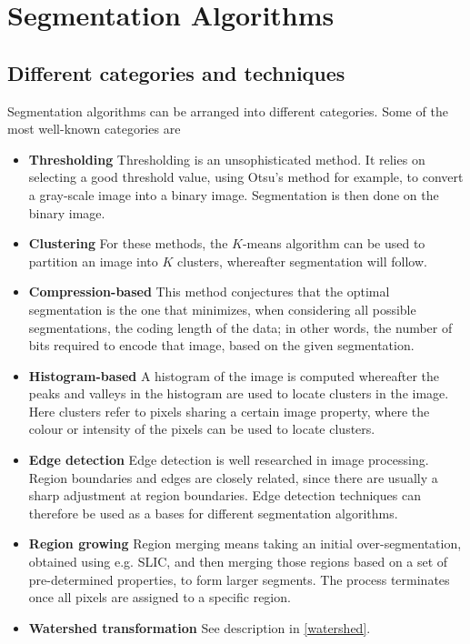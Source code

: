 \documentclass[a4paper,10pt]{article}
\begin{document}
\newpage
\section{Segmentation Algorithms}
\subsection{Different categories and techniques}
Segmentation algorithms can be arranged into different categories. 
Some of the most well-known categories are
\begin{itemize}
 \item \textbf{Thresholding}\cite{threshold}  Thresholding is an unsophisticated method. It
relies on
     selecting a good threshold
     value, using Otsu's method for example, to convert a gray-scale image into
a binary image.  Segmentation is
     then done on the binary image. 
 \item \textbf{Clustering} For these methods, the $K$-means algorithm
can be used to partition an image into $K$ clusters, whereafter
segmentation will follow.
 \item \textbf{Compression-based}\cite{compression} This method conjectures that the
optimal segmentation is the one that minimizes, when considering all possible
segmentations, the coding length of the data; in other words, the number of bits
required to encode that image, based on the given segmentation.
 \item \textbf{Histogram-based}\cite{threshold}  A histogram of 
the image is computed whereafter the peaks and valleys in the histogram
are used to locate clusters in the image.  Here clusters refer to pixels
sharing a certain image property, where the colour or intensity of the pixels can be used
to
locate clusters.
 \item \textbf{Edge detection}\cite{edge} Edge detection is well researched in image
processing.  Region boundaries and edges are closely related,
since there are usually a sharp adjustment at region boundaries.  Edge detection
techniques can therefore be used as a bases for different segmentation
algorithms.
 \item \textbf{Region growing}\cite{threshold} Region merging means taking an initial 
 over-segmentation,
obtained using e.g. SLIC, and then merging those regions based on a set of
pre-determined properties, to form larger segments.  The process
terminates once all pixels are assigned to a specific region.  
 \item \textbf{Watershed transformation} See description in \ref{watershed}.    

\end{itemize}
\end{document}
